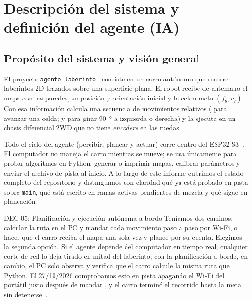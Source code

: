\section{Descripción del sistema y definición del agente (IA)}
\label{sec:sistema-agente}

\subsection{Propósito del sistema y visión general}
\label{subsec:proposito-vision}

El proyecto \texttt{agente-laberinto}~\cite{repo2026agentelaberinto} consiste en un carro autónomo que recorre laberintos 2D trazados sobre una superficie plana. El robot recibe de antemano el mapa con las paredes, su posición y orientación inicial  y la celda meta $(f_g, c_g)$. Con esa información calcula una secuencia de movimientos relativos ( para avanzar una celda;  y  para girar \SI{90}{\degree} a izquierda o derecha) y la ejecuta en un chasis diferencial 2WD que no tiene \textit{encoders} en las ruedas.

Todo el ciclo del agente (percibir, planear y actuar) corre dentro del ESP32-S3~\cite{arquitectura2026doc}. El computador no maneja el carro mientras se mueve; se usa únicamente para probar algoritmos en Python, generar o imprimir mapas, calibrar parámetros y enviar el archivo de pista al inicio. A lo largo de este informe cubrimos el estado completo del repositorio y distinguimos con claridad qué ya está probado en pista sobre \texttt{main}, qué está escrito en ramas activas pendientes de mezcla y qué sigue en planeación.

\begin{decision}{DEC-05: Planificación y ejecución autónoma a bordo}
Teníamos dos caminos: calcular la ruta en el PC y mandar cada movimiento paso a paso por Wi-Fi, o hacer que el carro reciba el mapa una sola vez y planee por su cuenta. Elegimos la segunda opción. Si el agente depende del computador en tiempo real, cualquier corte de red lo deja tirado en mitad del laberinto; con la planificación a bordo, en cambio, el PC solo observa y verifica que el carro calcule la misma ruta que Python. El 27/10/2026 comprobamos esto en pista apagando el Wi-Fi del portátil justo después de mandar , y el carro terminó el recorrido hasta la meta sin detenerse~\cite{arquitectura2026doc}.
\end{decision}

